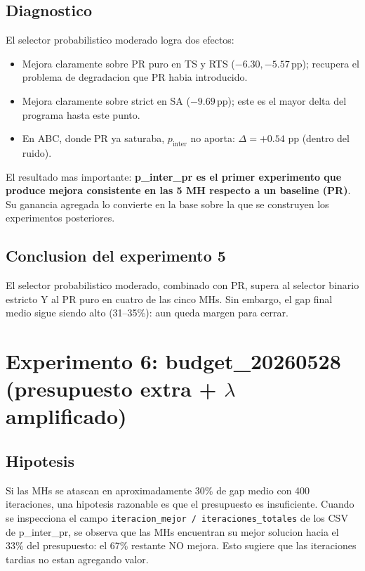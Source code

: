 \subsection{Diagnostico}

El selector probabilistico moderado logra dos efectos:

\begin{itemize}
\item Mejora claramente sobre PR puro en TS y RTS ($-6.30, -5.57$\,pp);
  recupera el problema de degradacion que PR habia introducido.
\item Mejora claramente sobre strict en SA ($-9.69$\,pp); este es el
  mayor delta del programa hasta este punto.
\item En ABC, donde PR ya saturaba, $p_{\text{inter}}$ no aporta:
  $\Delta = +0.54$ pp (dentro del ruido).
\end{itemize}

El resultado mas importante: \textbf{p\_inter\_pr es el primer
experimento que produce mejora consistente en las 5 MH respecto a un
baseline (PR)}. Su ganancia agregada lo convierte en la base sobre la
que se construyen los experimentos posteriores.

\subsection{Conclusion del experimento 5}

El selector probabilistico moderado, combinado con PR, supera al
selector binario estricto Y al PR puro en cuatro de las cinco MHs.
Sin embargo, el gap final medio sigue siendo alto (31--35\%): aun
queda margen para cerrar.

\section{Experimento 6: budget\_20260528 (presupuesto extra + $\lambda$ amplificado)}
\label{sec:exp-budget}

\subsection{Hipotesis}

Si las MHs se atascan en aproximadamente 30\% de gap medio con 400
iteraciones, una hipotesis razonable es que el presupuesto es
insuficiente. Cuando se inspecciona el campo
\texttt{iteracion\_mejor / iteraciones\_totales} de los CSV de
p\_inter\_pr, se observa que las MHs encuentran su mejor solucion
hacia el 33\% del presupuesto: el 67\% restante NO mejora. Esto
sugiere que las iteraciones tardias no estan agregando valor.


